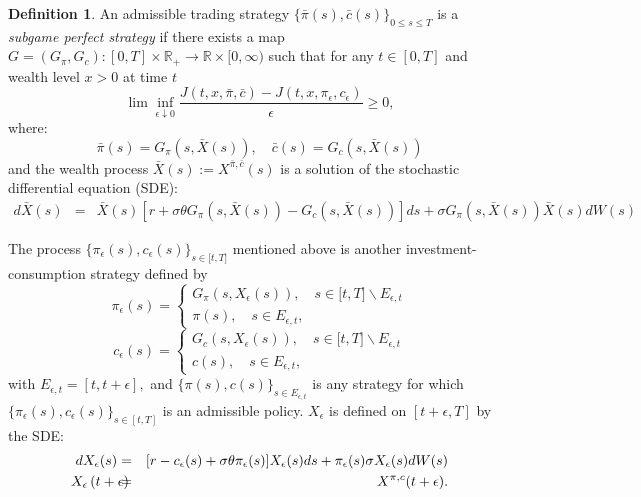 \documentclass[11pt, psfig]{article}
\theoremstyle{definition}
\newtheorem{definition}[theorem]{Definition}
\theoremstyle{remark}
\numberwithin{equation}{section}
\begin{document}
\begin{definition}\label{def13_1}
An admissible trading strategy $\{\bar{\pi}(s),\bar{c}(s)\}_{0\leq s\leq T}$ is a \emph{subgame perfect strategy} if there exists a map $%
G=(G_{\pi}, G_{c}):[0,T]\times \mathbb{R_{+}}\rightarrow \mathbb{R}\times
\lbrack 0,\infty )$ such that for any $t\in [0,T] $ and wealth level $x >0$ at time $t$ 
\begin{equation}\label{eq13_1}
{\lim \inf_{\epsilon \downarrow 0}}\frac{J(t,x,\bar{\pi},\bar{c}%
)-J(t,x,\pi _{\epsilon },c_{\epsilon})}{\epsilon }\geq 0,
\end{equation}%
where:%
\begin{equation}\label{eq13_2}
\bar{\pi}(s)={G_{\pi}(s,\bar{X}(s))},\quad \bar{c}(s)=G_{c}(s,\bar{X}%
(s))
\end{equation}%
and the wealth process $\bar{X}(s):= X^{\bar{\pi},\bar{c}}(s) $ is a solution of
the stochastic differential equation (SDE): 
\begin{eqnarray}\label{eq13_3}
d\bar{X}(s)&=&\bar{X}(s)[r+\sigma\theta G_{\pi}(s,\bar{X}(s))-G_{c}(s,\bar{X}(s))]ds +\sigma G_{\pi}(s,\bar{X}(s))\bar{X}(s) dW(s)
\end{eqnarray}

The process $\{{\pi }_{\epsilon }(s),{c}_{\epsilon
}(s)\}_{s\in \lbrack t,T]}$ mentioned above is another
investment-consumption strategy defined by 
\begin{equation}\label{eq13_4}
\pi _{\epsilon }(s)=%
\begin{cases}
G_{\pi}(s, X_{\epsilon}(s)),\quad s\in \lbrack t,T]\backslash E_{\epsilon ,t} \\ 
\pi (s),\quad s\in E_{\epsilon ,t},%
\end{cases}
\end{equation}%
\begin{equation}\label{eq13_5}
c_{\epsilon }(s)=%
\begin{cases}
G_c(s,X_{\epsilon}(s)),\quad s\in \lbrack t,T]\backslash E_{\epsilon ,t} \\ 
c(s),\quad s\in E_{\epsilon ,t},%
\end{cases}
\end{equation}%
with $E_{\epsilon,t}=[t,t+\epsilon],$ and $\{{\pi}(s),{c}(s)\}_{s\in E_{\epsilon,t} }$ is any strategy for which $\{{\pi}%
_{\epsilon}(s),{c}_{\epsilon} (s)\}_{s\in[t,T]}$ is an
admissible policy.
$X_{\epsilon}$ is defined on $[t+\epsilon,T]$ by the SDE:
\begin{eqnarray}\label{eq13_6}
\!\!\!\!\!\!d X_{\epsilon}(s)&=&[r-c_{\epsilon}(s)+\sigma\theta\pi_{\epsilon}(s)]X_{\epsilon}(s)ds+\pi_{\epsilon}
(s)\sigma X_{\epsilon}(s)dW(s)  \notag   \\
X_{\epsilon}\left( t+\epsilon\right) \!\!\!\! \!&=&\!\!\!\!\! X^{\pi,c}(t+\epsilon).
\end{eqnarray}

\end{definition}
\end{document}

